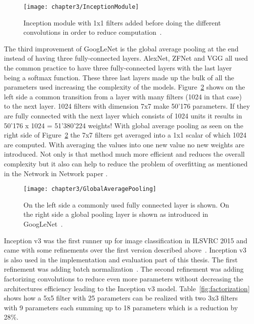 \begin{figure}[!h]
  \centering
  \caption{Inception module with 1x1 filters added before doing the different convolutions in order to reduce computation~\cite{ReviewGoogleLeNetv1}.}
  \texttt{[image: chapter3/InceptionModule]}
  \label{fig:InceptionModule}
\end{figure}

\quad

The third improvement of GoogLeNet is the global average pooling at the end instead of having three fully-connected layers. AlexNet, ZFNet and VGG all used the common practice to have three fully-connected layers with the last layer being a softmax function. These three last layers made up the bulk of all the parameters used increasing the complexity of the models. Figure~\ref{fig:GlobalAveragePooling} shows on the left side a common transition from a layer with many filters (1024 in that case) to the next layer. 1024 filters with dimension 7x7 make 50'176 parameters. If they are fully connected with the next layer which consists of 1024 units it results in 50'176 x 1024 = 51'380'224 weights! With global average pooling as seen on the right side of Figure~\ref{fig:GlobalAveragePooling} the 7x7 filters get averaged into a 1x1 scalar of which 1024 are computed. With averaging the values into one new value no new weights are introduced. Not only is that method much more efficient and reduces the overall complexity but it also can help to reduce the problem of overfitting as mentioned in the Network in Network paper \cite{lin2013network}.\\


\begin{figure}[!h]
  \centering
  \caption{On the left side a commonly used fully connected layer is shown. On the right side a global pooling layer is shown as introduced in GoogLeNet~\cite{ReviewGoogleLeNetv1}.}
  \texttt{[image: chapter3/GlobalAveragePooling]}
  \label{fig:GlobalAveragePooling}
\end{figure}

\quad

Inception v3 was the first runner up for image classification in ILSVRC 2015 and came with some refinements over the first version described above~\cite{szegedy2016rethinking}. Inception v3 is also used in the implementation and evaluation part of this thesis. The first refinement was adding batch normalization~\cite{ioffe2015batch}. The second refinement was adding factorizing convolutions to reduce even more parameters without decreasing the architectures efficiency leading to the Inception v3 model. Table~\ref{fig:factorization} shows how a 5x5 filter with 25 parameters can be realized with two 3x3 filters with 9 parameters each summing up to 18 parameters which is a reduction by 28\%. \\


